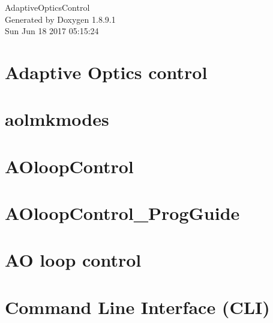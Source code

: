 \documentclass[twoside]{book}
\newcommand{\+}{\discretionary{\mbox{\scriptsize$\hookleftarrow$}}{}{}}
\newcommand{\clearemptydoublepage}{%
  \newpage{\pagestyle{empty}\cleardoublepage}%
}
\begin{document}
\hypersetup{pageanchor=false,
             bookmarks=true,
             bookmarksnumbered=true,
             pdfencoding=unicode
            }
\begin{titlepage}
\vspace*{7cm}
\begin{center}%
{\Large Adaptive\+Optics\+Control }\\
\vspace*{1cm}
{\large Generated by Doxygen 1.8.9.1}\\
\vspace*{0.5cm}
{\small Sun Jun 18 2017 05:15:24}\\
\end{center}
\end{titlepage}
\clearemptydoublepage
\tableofcontents
\clearemptydoublepage
{}
\hypersetup{pageanchor=true}

\chapter{Adaptive Optics control}
\label{md_README}
\hypertarget{md_README}{}

\chapter{aolmkmodes}
\label{md_src_AOloopControl_doc_aolmkmodes}
\hypertarget{md_src_AOloopControl_doc_aolmkmodes}{}

\chapter{A\+Oloop\+Control}
\label{md_src_AOloopControl_doc_AOloopControl}
\hypertarget{md_src_AOloopControl_doc_AOloopControl}{}

\chapter{A\+Oloop\+Control\+\_\+\+Prog\+Guide}
\label{md_src_AOloopControl_doc_AOloopControl_ProgGuide}
\hypertarget{md_src_AOloopControl_doc_AOloopControl_ProgGuide}{}

\chapter{A\+O loop control}
\label{AOloopControl}
\hypertarget{AOloopControl}{}

\chapter{Command Line Interface (C\+L\+I)}
\label{md_src_CLIcore}
\hypertarget{md_src_CLIcore}{}

\end{document}
